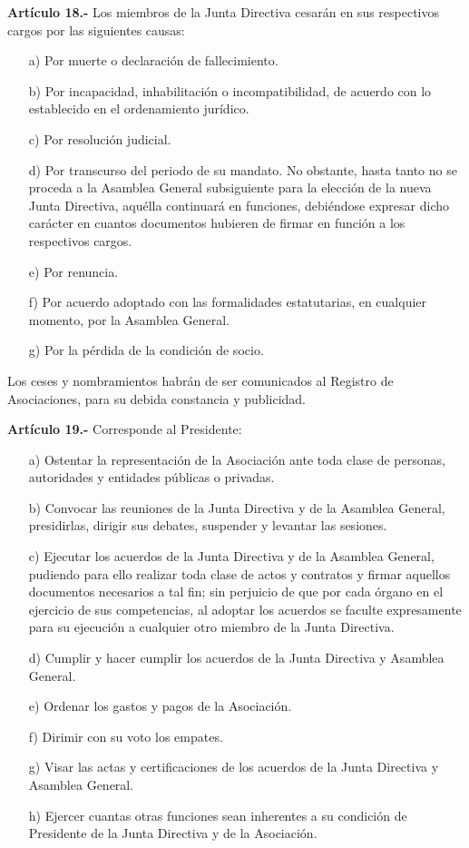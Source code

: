 \documentclass[a4paper,12pt]{article}
\begin{document}
\begin{onehalfspace}
\textbf{Art\'iculo 18.-} Los miembros de la Junta Directiva cesar\'an en sus respectivos cargos por las siguientes causas:
\begin{itemize}
\item [a)] Por muerte o declaraci\'on de fallecimiento.
\item [b)] Por incapacidad, inhabilitaci\'on o incompatibilidad, de acuerdo con lo establecido en el ordenamiento jur\'idico.
\item [c)] Por resoluci\'on judicial.
\item [d)] Por transcurso del periodo de su mandato. No obstante, hasta tanto no se proceda a la Asamblea General subsiguiente para la elecci\'on de la nueva Junta Directiva, aqu\'ella continuar\'a en funciones, debi\'endose expresar dicho car\'acter en cuantos documentos hubieren de firmar en funci\'on a los respectivos cargos.
\item [e)] Por renuncia.
\item [f)] Por acuerdo adoptado con las formalidades estatutarias, en cualquier momento, por la Asamblea General.
\item [g)] Por la p\'erdida de la condici\'on de socio.
\end{itemize}

Los ceses y nombramientos habr\'an de ser comunicados al Registro de Asociaciones, para su debida constancia y publicidad.

\bigskip\bigskip

\textbf{Art\'iculo 19.-} Corresponde al Presidente:
\begin{itemize}
\item [a)] Ostentar la representaci\'on de la Asociaci\'on ante toda clase de personas, autoridades y entidades p\'ublicas o privadas.
\item [b)] Convocar las reuniones de la Junta Directiva y de la Asamblea General, presidirlas, dirigir sus debates, suspender y levantar las sesiones.
\item [c)] Ejecutar los acuerdos de la Junta Directiva y de la Asamblea General, pudiendo para ello realizar toda clase de actos y contratos y firmar aquellos documentos necesarios a tal fin; sin perjuicio de que por cada \'organo en el ejercicio de sus competencias, al adoptar los acuerdos se faculte expresamente para su ejecuci\'on a cualquier otro miembro de la Junta Directiva.
\item [d)] Cumplir y hacer cumplir los acuerdos de la Junta Directiva y Asamblea General.
\item [e)] Ordenar los gastos y pagos de la Asociaci\'on.
\item [f)] Dirimir con su voto los empates.
\item [g)] Visar las actas y certificaciones de los acuerdos de la Junta Directiva y Asamblea General.
\item [h)] Ejercer cuantas otras funciones sean inherentes a su condici\'on de Presidente de la Junta Directiva y de la Asociaci\'on.
\end{itemize}


\end{onehalfspace}
\end{document}
